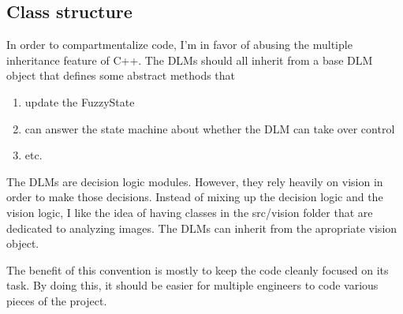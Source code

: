 \documentclass[11pt]{scrartcl}
\begin{document}
    \subsection{Class structure}
      In order to compartmentalize code, I'm in favor of abusing the multiple inheritance feature of C++. The DLMs should all inherit from a base DLM object that defines some abstract methods that

      \begin{enumerate}
        \item update the FuzzyState

        \item can answer the state machine about whether the DLM can take over control

        \item etc.
      \end{enumerate}

      The DLMs are decision logic modules. However, they rely heavily on vision in order to make those decisions. Instead of mixing up the decision logic and the vision logic, I like the idea of having classes in the src/vision folder that are dedicated to analyzing images. The DLMs can inherit from the apropriate vision object.

      The benefit of this convention is mostly to keep the code cleanly focused on its task. By doing this, it should be easier for multiple engineers to code various pieces of the project.
\end{document}
